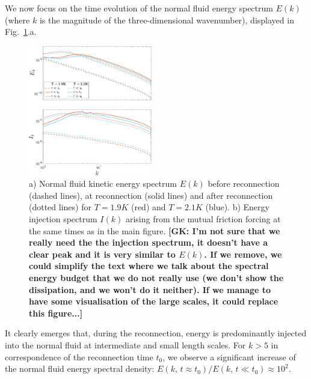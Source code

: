 \documentclass[%
 reprint,
 amsmath,amssymb,
 aps,
 prl,
]{revtex4-2}
\newcommand*{\NOTE}[1]{\textbf{\color{red}[#1]}}
\begin{document}
{We now focus on the time evolution of the normal fluid energy spectrum $E(k)$ (where $k$ is the magnitude of the three-dimensional wavenumber), displayed in Fig.~\ref{fig:kinetic-energy}.a. 
\begin{figure}[b]
    \centering
    \includegraphics*[width=0.48\textwidth]{energy-spec.pdf}
    \caption{a) Normal fluid kinetic energy spectrum $E(k)$ before 
reconnection (dashed lines), at reconnection (solid lines) 
and after reconnection (dotted lines) for $T=1.9K$ (red)
and $T=2.1K$ (blue). 
b) Energy injection spectrum $I(k)$ arising from the 
mutual friction forcing at the same times as in the main figure. \NOTE{GK: I'm not sure that we really need the the injection spectrum, it doesn't have a clear peak and it is very similar to $E(k)$. If we remove, we could simplify the text where we talk about the spectral energy budget that we do not really use (we don't show the dissipation, and we won't do it neither). If we manage to have some visualisation of the large scales, it could replace this figure...}}
    \label{fig:kinetic-energy}
\end{figure}
%
%
It clearly emerges that, during the reconnection, energy is predominantly injected into the normal fluid at intermediate and small length scales. 
For $k>5$ in correspondence of the reconnection time $t_0$,
we observe a significant increase of the normal fluid energy spectral density:
$E(k,\, t\approx t_0)/E(k,\, t\ll t_0) \approx 10^2$. 

}
\end{document}
